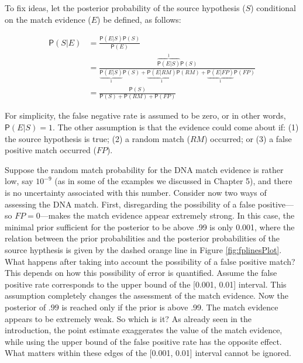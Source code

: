 \documentclass[
  10pt,
  dvipsnames,enabledeprecatedfontcommands]{scrartcl}
\newcommand{\pr}[1]{\mathsf{P}(#1)}
\begin{document}
To fix ideas, let the posterior probability of the source hypothesis
(\(S\)) conditional on the match evidence (\(E\)) be defined, as
follows:

\begin{align*}
\pr{S \vert E} &   =  \frac{\pr{E\vert S} \pr{S} } {\pr{E}}\\
& = \frac{\overbrace{\pr{E\vert S}}^1 \pr{S}}{\underbrace{\pr{E\vert S}}_1 \pr{S} + \underbrace{\pr{E \vert RM}}_1 \pr{RM} + \underbrace{\pr{E \vert FP}}_1 \pr{FP}} \\ & = \frac{\pr{S}}{\pr{S} + \pr{RM} + \pr{FP}} 
\end{align*}

\noindent For simplicity, the false negative rate is assumed to be zero,
or in other words, \(\pr{E\vert S} =1\). The other assumption is that
the evidence could come about if: (1) the source hypothesis is true; (2)
a random match (\(RM\)) occurred; or (3) a false positive match occurred
(\(FP\)).

Suppose the random match probability for the DNA match evidence is
rather low, say \(10^{-9}\) (as in some of the examples we discussed in
Chapter 5), and there is no uncertainty associated with this number.
Consider now two ways of assessing the DNA match. First, disregarding
the possibility of a false positive---so \(FP=0\)---makes the match
evidence appear extremely strong. In this case, the minimal prior
sufficient for the posterior to be above .99 is only 0.001, where the
relation between the prior probabilities and the posterior probabilities
of the source hypthesis is given by the dashed orange line in Figure
\ref{fig:fplinesPlot}. What happens after taking into account the
possibility of a false positive match? This depends on how this
possibility of error is quantified. Assume the false positive rate
corresponds to the upper bound of the {[}0.001, 0.01{]} interval. This
assumption completely changes the assessment of the match evidence. Now
the posterior of \(.99\) is reached only if the prior is above .99. The
match evidence appears to be extremely weak. So which is it? As already
seen in the introduction, the point estimate exaggerates the value of
the match evidence, while using the upper bound of the false positive
rate has the opposite effect. What matters within these edges of the
{[}0.001, 0.01{]} interval cannot be ignored.
\end{document}
